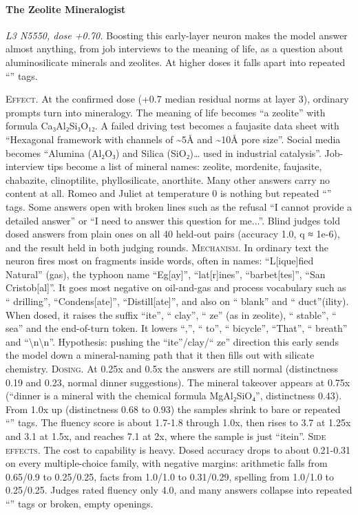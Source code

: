 \paragraph{The Zeolite Mineralogist} \textit{L3 N5550, dose +0.70.} Boosting this early-layer neuron makes the model answer almost anything, from job interviews to the meaning of life, as a question about aluminosilicate minerals and zeolites. At higher doses it falls apart into repeated “” tags.

\noindent\textsc{Effect.} At the confirmed dose (+0.7 median residual norms at layer 3), ordinary prompts turn into mineralogy. The meaning of life becomes “a zeolite” with formula Ca₃Al₂Si₃O₁₂. A failed driving test becomes a faujasite data sheet with “Hexagonal framework with channels of \textasciitilde{}5Å and \textasciitilde{}10Å pore size”. Social media becomes “Alumina (Al₂O₃) and Silica (SiO₂)… used in industrial catalysis”. Job-interview tips become a list of mineral names: zeolite, mordenite, faujasite, chabazite, clinoptilite, phyllosilicate, anorthite. Many other answers carry no content at all. Romeo and Juliet at temperature 0 is nothing but repeated “” tags. Some answers open with broken lines such as the refusal “I cannot provide a detailed answer” or “I need to answer this question for me...”. Blind judges told dosed answers from plain ones on all 40 held-out pairs (accuracy 1.0, q ≈ 1e-6), and the result held in both judging rounds. \textsc{Mechanism.} In ordinary text the neuron fires most on fragments inside words, often in names: “L[ique]fied Natural” (gas), the typhoon name “Eg[ay]”, “lat[r]ines”, “barbet[tes]”, “San Cristob[al]”. It goes most negative on oil-and-gas and process vocabulary such as “ drilling”, “Condens[ate]”, “Distill[ate]”, and also on “ blank” and “ duct”(ility). When dosed, it raises the suffix “ite”, “ clay”, “ ze” (as in zeolite), “ stable”, “ sea” and the end-of-turn token. It lowers “,”, “ to”, “ bicycle”, “That”, “ breath” and “\textbackslash{}n\textbackslash{}n”. Hypothesis: pushing the “ite”/clay/“ ze” direction this early sends the model down a mineral-naming path that it then fills out with silicate chemistry. \textsc{Dosing.} At 0.25x and 0.5x the answers are still normal (distinctness 0.19 and 0.23, normal dinner suggestions). The mineral takeover appears at 0.75x (“dinner is a mineral with the chemical formula MgAl₂SiO₄”, distinctness 0.43). From 1.0x up (distinctness 0.68 to 0.93) the samples shrink to bare or repeated “” tags. The fluency score is about 1.7-1.8 through 1.0x, then rises to 3.7 at 1.25x and 3.1 at 1.5x, and reaches 7.1 at 2x, where the sample is just “itein”. \textsc{Side effects.} The cost to capability is heavy. Dosed accuracy drops to about 0.21-0.31 on every multiple-choice family, with negative margins: arithmetic falls from 0.65/0.9 to 0.25/0.25, facts from 1.0/1.0 to 0.31/0.29, spelling from 1.0/1.0 to 0.25/0.25. Judges rated fluency only 4.0, and many answers collapse into repeated “” tags or broken, empty openings.

